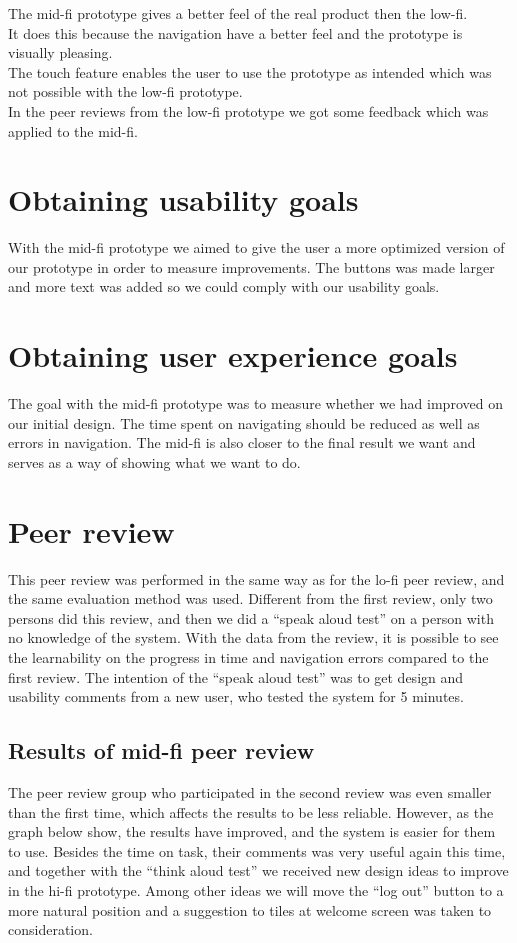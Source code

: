 The mid-fi prototype gives a better feel of the real product then the low-fi.\\
It does this because the navigation have a better feel and the prototype is visually pleasing.\\
The touch feature enables the user to use the prototype as intended which was not possible with the low-fi prototype.\\
In the peer reviews from the low-fi prototype we got some feedback which was applied to the mid-fi.\\

\section{Obtaining usability goals}
With the mid-fi prototype we aimed to give the user a more optimized version of our prototype in order to measure improvements. The buttons was made larger and more text was added so we could comply with our usability goals.

\section{Obtaining user experience goals}
The goal with the mid-fi prototype was to measure whether we had improved on our initial design. The time spent on navigating should be reduced as well as errors in navigation. The mid-fi is also closer to the final result we want and serves as a way of showing what we want to do.

\section{Peer review}
This peer review was performed in the same way as for the lo-fi peer review, and the same evaluation method was used. Different from the first review, only two persons did this review, and then we did a “speak aloud test” on a person with no knowledge of the system. With the data from the review, it is possible to see the learnability on the progress in time and navigation errors compared to the first review. The intention of the “speak aloud test” was to get design and usability comments from a new user, who tested the system for 5 minutes. \\
\subsection{Results of mid-fi peer review}
The peer review group who participated in the second review was even smaller than the first time, which affects the results to be less reliable. However, as the graph below show, the results have improved, and the system is easier for them to use. Besides the time on task, their comments was very useful again this time, and together with the “think aloud test” we received new design ideas to improve in the hi-fi prototype. Among other ideas we will move the “log out” button to a more natural position and a suggestion to tiles at welcome screen was taken to consideration. \\

